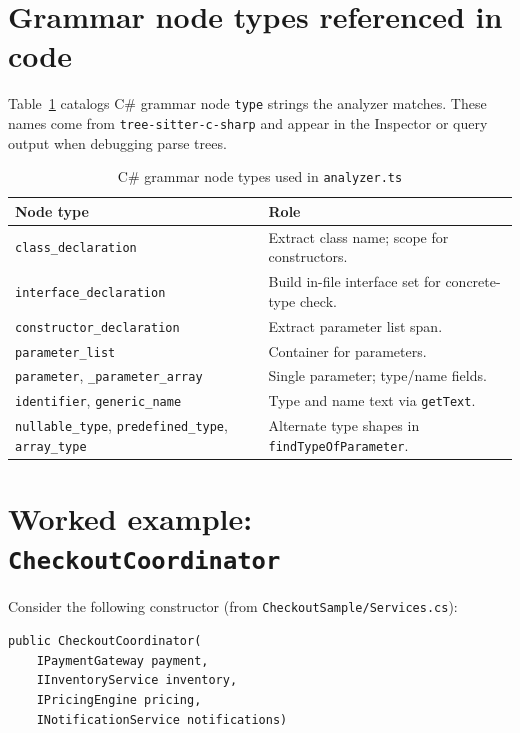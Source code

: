 \section{Grammar node types referenced in code}
\label{chap3:node-types}

Table~\ref{tab:grammar-nodes} catalogs C\# grammar node \texttt{type} strings the analyzer matches. These names come from \texttt{tree-sitter-c-sharp} and appear in the Inspector or query output when debugging parse trees.

\begin{table}[htbp]
\centering
\caption{C\# grammar node types used in \texttt{analyzer.ts}}
\label{tab:grammar-nodes}
\small
\begin{tabular}{|l|p{10cm}|}
\hline
\textbf{Node type} & \textbf{Role} \\
\hline
\texttt{class\_declaration} & Extract class name; scope for constructors. \\
\hline
\texttt{interface\_declaration} & Build in-file interface set for concrete-type check. \\
\hline
\texttt{constructor\_declaration} & Extract parameter list span. \\
\hline
\texttt{parameter\_list} & Container for parameters. \\
\hline
\texttt{parameter}, \texttt{\_parameter\_array} & Single parameter; type/name fields. \\
\hline
\texttt{identifier}, \texttt{generic\_name} & Type and name text via \texttt{getText}. \\
\hline
\texttt{nullable\_type}, \texttt{predefined\_type}, \texttt{array\_type} & Alternate type shapes in \texttt{findTypeOfParameter}. \\
\hline
\end{tabular}
\end{table}

\section{Worked example: \texttt{CheckoutCoordinator}}
\label{chap3:worked-example}

Consider the following constructor (from \texttt{CheckoutSample/Services.cs}):

\begin{lstlisting}[caption={CheckoutCoordinator constructor (excerpt)}]
public CheckoutCoordinator(
    IPaymentGateway payment,
    IInventoryService inventory,
    IPricingEngine pricing,
    INotificationService notifications)
\end{lstlisting}

